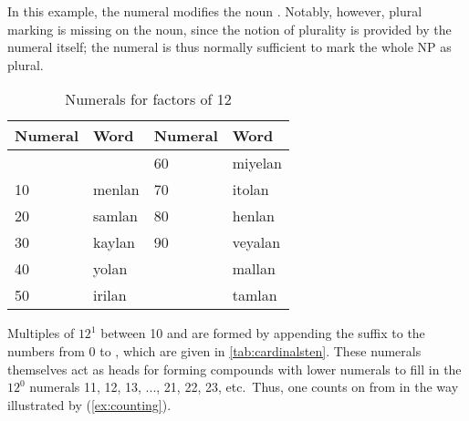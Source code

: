 In this example, the numeral  modifies the noun 
. Notably, however, plural marking is missing on the 
noun, since the notion of plurality is provided by the numeral itself; the 
numeral is thus normally sufficient to mark the whole NP as plural.

\begin{table}[p]\centering
\caption{Numerals for factors of 12}
\begin{tabu} to .75\linewidth {X[c] I X[c] I}
\toprule\tableheaderfont
Numeral
	& Word
	& Numeral
	& Word
	\\
\toprule

%
	& %
	& 60
	& miyelan %
	\\

10 
	& menlan %
	& 70
	& itolan %
	\\

20 
	& samlan %
	& 80
	& henlan %
	\\

30 
	& kaylan %
	& 90
	& veyalan %
	\\

40 
	& yolan %
	& 
	& mallan %
	\\

50 
	& irilan %
	& 
	& tamlan %
	\\

\bottomrule
\end{tabu}
\label{tab:cardinalsten}
\end{table}

Multiples of $12^1$ between 10 and  are formed by appending the suffix
 to the numbers from 0 to \elv, which are given in
\autoref{tab:cardinalsten}. These numerals themselves act as heads for forming
compounds with lower numerals to fill in the $12^0$ numerals 11, 12, 13, ...,
21, 22, 23, etc.\ Thus, one counts on from  in
the way illustrated by (\ref{ex:counting}).


